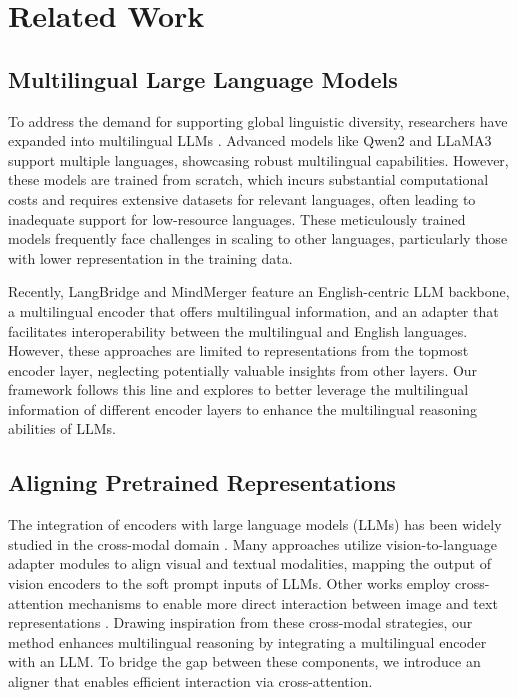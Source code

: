 \section{Related Work}
\subsection{Multilingual Large Language Models}

To address the demand for supporting global linguistic diversity, researchers have expanded into multilingual LLMs \cite{qin2025survey}. Advanced models like Qwen2 \cite{qwen2} and LLaMA3 \cite{llama3} support multiple languages, showcasing robust multilingual capabilities. However, these models are trained from scratch, which incurs substantial computational costs and requires extensive datasets for relevant languages, often leading to inadequate support for low-resource languages. These meticulously trained models frequently face challenges in scaling to other languages, particularly those with lower representation in the training data.

Recently, LangBridge \cite{langbridge} and MindMerger \cite{mindmerger} feature an English-centric LLM backbone, a multilingual encoder that offers multilingual information, and an adapter that facilitates interoperability between the multilingual and English languages. However, these approaches are limited to representations from the topmost encoder layer, neglecting potentially valuable insights from other layers. Our \mname framework follows this line and explores to better leverage the multilingual information of different encoder layers to enhance the multilingual reasoning abilities of LLMs. 


\subsection{Aligning Pretrained Representations} 
The integration of encoders with large language models (LLMs) has been widely studied in the cross-modal domain \cite{llava, minigptv, multi-model-1}. Many approaches utilize vision-to-language adapter modules to align visual and textual modalities, mapping the output of vision encoders to the soft prompt inputs of LLMs. Other works employ cross-attention mechanisms to enable more direct interaction between image and text representations \cite{flamingo, evlm}. 
Drawing inspiration from these cross-modal strategies, our method enhances multilingual reasoning by integrating a multilingual encoder with an LLM. To bridge the gap between these components, we introduce an aligner that enables efficient interaction via cross-attention.
